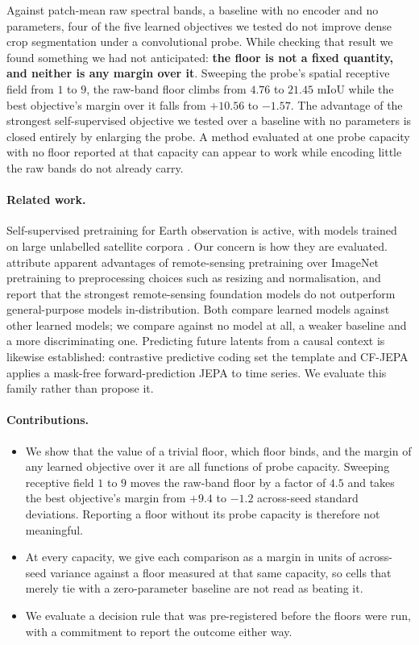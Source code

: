\documentclass{article}
\begin{document}
Against patch-mean raw spectral bands, a baseline with no encoder and no parameters, four of the
five learned objectives we tested do not improve dense crop segmentation under a convolutional
probe. While checking that result we found something we had not anticipated: \textbf{the floor is
not a fixed quantity, and neither is any margin over it}. Sweeping the probe's spatial receptive
field from $1$ to $9$, the raw-band floor climbs from $4.76$ to $21.45$ mIoU while the best
objective's margin over it falls from $+10.56$ to $-1.57$. The advantage of the strongest
self-supervised objective we tested over a baseline with no parameters is closed entirely by
enlarging the probe. A method evaluated at one probe capacity with no floor reported at that
capacity can appear to work while encoding little the raw bands do not already carry.

\paragraph{Related work.} Self-supervised pretraining for Earth observation is active, with models
trained on large unlabelled satellite corpora \citep{cong2022satmae, wang2023ssl4eo}. Our concern is
how they are evaluated.
\citet{corley2023revisiting} attribute apparent advantages of remote-sensing pretraining over
ImageNet pretraining to preprocessing choices such as resizing and normalisation, and
\citet{tamazyan2025geocrossbench} report that the strongest remote-sensing foundation models do not
outperform general-purpose models in-distribution. Both compare learned models against other learned
models; we compare against no model at all, a weaker baseline and a more discriminating one. Predicting future latents from a causal context is likewise
established: contrastive predictive coding \citep{oord2018cpc} set the template and CF-JEPA
\citep{lee2026cfjepa} applies a mask-free forward-prediction JEPA to time series. We evaluate this
family rather than propose it.

\paragraph{Contributions.}
\begin{itemize}\itemsep0pt
  \item We show that the value of a trivial floor, which floor binds, and the margin of any learned
        objective over it are all functions of probe capacity. Sweeping receptive field $1$ to $9$
        moves the raw-band floor by a factor of $4.5$ and takes the best objective's margin from
        $+9.4$ to $-1.2$ across-seed standard deviations. Reporting a floor without its probe
        capacity is therefore not meaningful.
  \item At every capacity, we give each comparison as a margin in units of across-seed variance
        against a floor measured at that same capacity, so cells that merely tie with a
        zero-parameter baseline are not read as beating it.
  \item We evaluate a decision rule that was pre-registered before the floors were run, with a
        commitment to report the outcome either way.
\end{itemize}
\end{document}
